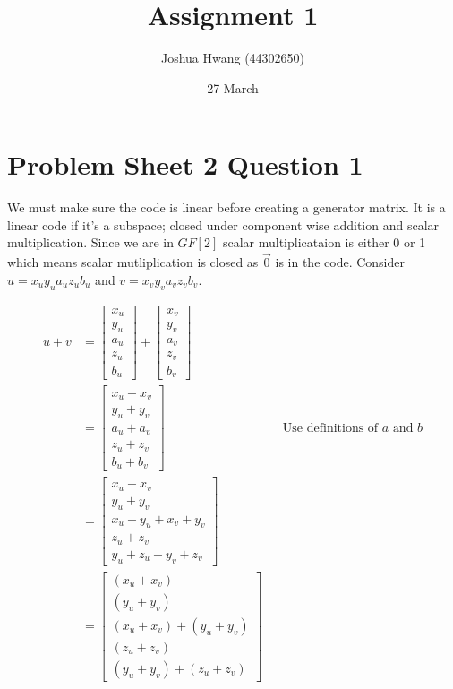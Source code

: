 \documentclass{article}
\title{Assignment 1}
\author{Joshua Hwang (44302650)}
\date{27 March}
\begin{document}
\maketitle

\section{Problem Sheet 2 Question 1}
We must make sure the code is linear before creating a generator matrix.
It is a linear code if it's a subspace; closed under component wise addition
and scalar multiplication. Since we are in $GF[2]$ scalar multiplicataion is
either 0 or 1 which means scalar mutliplication is closed as $\vec{0}$ is
in the code. Consider $u = x_u y_u a_u z_u b_u$ and $v = x_v y_v a_v z_v b_v$.

\begin{align*}
    u + v
    &= \begin{bmatrix}
        x_u \\
        y_u \\
        a_u \\
        z_u \\
        b_u
    \end{bmatrix}
    +
    \begin{bmatrix}
        x_v \\
        y_v \\
        a_v \\
        z_v \\
        b_v
    \end{bmatrix} \\
    &= \begin{bmatrix}
        x_u + x_v \\
        y_u + y_v \\
        a_u + a_v \\
        z_u + z_v \\
        b_u + b_v
    \end{bmatrix}
    && \text{Use definitions of $a$ and $b$} \\
    &= \begin{bmatrix}
        x_u + x_v \\
        y_u + y_v \\
        x_u + y_u + x_v + y_v \\
        z_u + z_v \\
        y_u + z_u + y_v + z_v
    \end{bmatrix} \\
    &= \begin{bmatrix}
        (x_u + x_v) \\
        (y_u + y_v) \\
        (x_u + x_v) + (y_u + y_v) \\
        (z_u + z_v) \\
        (y_u + y_v) + (z_u + z_v)
    \end{bmatrix} \\
\end{align*}
\end{document}
